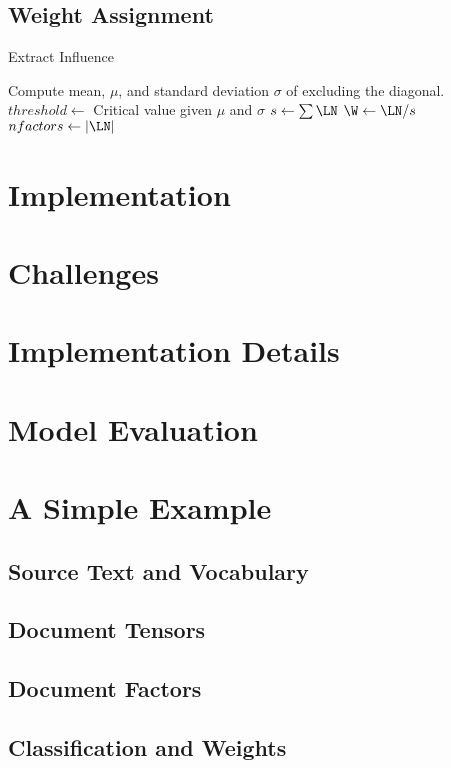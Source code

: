 \documentclass[../ut-dissertation.tex]{subfiles}
\begin{document}
\subsection{Weight Assignment}
\begin{algorithm}
  \caption{Extract Influence}
  \label{alg:influence}
   
   
  
  \Input{\Ndocs, \DM, \F, \LN}
  \Output{\W, \S}
  \BlankLine
  Compute mean, $\mu$, and standard deviation $\sigma$ of \DM
  excluding the diagonal.\; 
  $threshold \leftarrow$ Critical value given $\mu$ and $\sigma$\;
  \BlankLine
  $s \leftarrow \sum \LN$\;
  $\W \leftarrow \LN / s$\;
  \BlankLine
  $nfactors \leftarrow |\LN|$\;
  \Return{\W, \S}\;
\end{algorithm}

\section{Implementation }
\section{Challenges}
\section{Implementation Details}

\section{Model Evaluation}

\section{A Simple Example}
\subsection{Source Text and Vocabulary}
\subsection{Document Tensors}
\subsection{Document Factors}
\subsection{Classification and Weights}
\end{document}
